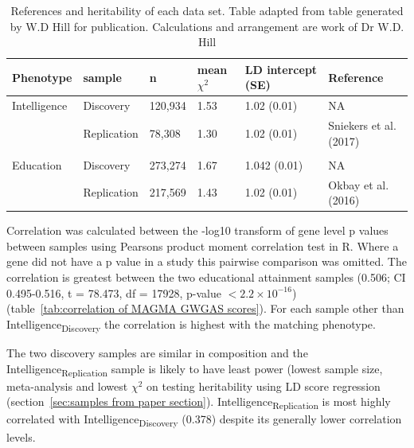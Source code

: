 \begin{table}[]
    \centering
   
  
    \setlength{\extrarowheight}{2pt}
     \begin{adjustbox}{width=\textwidth}
    \begin{tabular}{llllll}
    \toprule
        Phenotype &  sample & n & mean $\chi^2$ & LD intercept (SE) & Reference \\
        \midrule
       
        Intelligence& Discovery&120,934 & 1.53 & 1.02 (0.01)& NA\\
        & Replication &78,308 & 1.30 & 1.02 (0.01) & Sniekers et al.(2017)\cite{sniekers2017genome}\\
        \\
        Education& Discovery &273,274 & 1.67 & 1.042 (0.01) & NA\\
      & Replication & 217,569&1.43&1.02 (0.01) & Okbay et al.(2016)\cite{okbay2016genome}\\
         \bottomrule
    \end{tabular}
      \end{adjustbox}
    \caption[Size and heritability for each data sample]{References and heritability of each data set. Table adapted from table generated by W.D Hill for publication. Calculations and arrangement are work of Dr W.D. Hill}
    \label{tab:supplementary dh table 1 datasets}
\end{table}


Correlation was calculated between the -log10 transform of gene level p values between samples using Pearsons product moment correlation test in R. Where a gene did not have a p value in a study this pairwise comparison was omitted. The correlation is greatest between the two educational attainment samples (0.506; CI 0.495-0.516, t = 78.473, df = 17928, p-value $< 2.2 \times 10^{-16}$) (table~\ref{tab:correlation of MAGMA GWGAS scores}). For each sample other than Intelligence\textsubscript{Discovery} the correlation is highest with the matching phenotype.

The two discovery samples are similar in composition and the Intelligence\textsubscript{Replication} sample is likely to have least power (lowest sample size, meta-analysis and lowest $\chi^2$ on testing heritability using LD score regression (section~\ref{sec:samples from paper section}). Intelligence\textsubscript{Replication} is most highly correlated with Intelligence\textsubscript{Discovery} (0.378) despite its generally lower correlation levels. 

